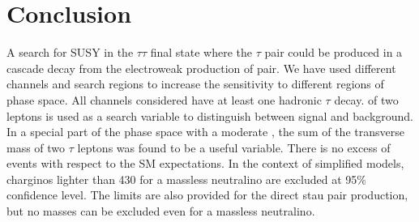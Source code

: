 \section{Conclusion}
\label{sect:conclusion}
A search for SUSY in the $\tau\tau$ final state where the
$\tau$ pair could be produced in a cascade decay from the electroweak production of \PSGcpDo pair.
We have used different channels and search regions to increase the sensitivity to
different regions of phase space. All channels considered have at least one hadronic $\tau$ decay.
 \mttwo of two leptons is used as a search variable to
distinguish between signal and background. In a special part of the phase space with
a moderate \mttwo, the sum of the transverse mass of two $\tau$ leptons was found to be a
useful variable.
There is no excess of events with respect to the SM expectations.
In the context of simplified models, charginos lighter than 430\GeV 
for a massless neutralino  are excluded at 95\% confidence level.
The limits are also provided for the direct stau pair production, but no masses  can be excluded 
even for a massless neutralino.

